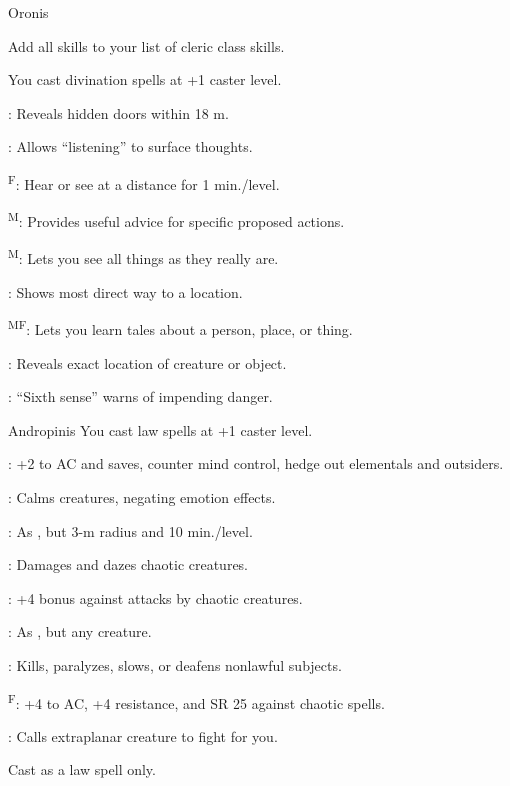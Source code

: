{Oronis}
{Add all  skills to your list of cleric class skills.

You cast divination spells at +1 caster level.}
{
	\item {}: Reveals hidden doors within 18 m.
	\item {}: Allows ``listening'' to surface thoughts.
	\item {}\textsuperscript{F}: Hear or see at a distance for 1 min./level.
	\item {}\textsuperscript{M}: Provides useful advice for specific proposed actions.
	\item {}\textsuperscript{M}: Lets you see all things as they really are.
	\item {}: Shows most direct way to a location.
	\item {}\textsuperscript{MF}: Lets you learn tales about a person, place, or thing.
	\item {}: Reveals exact location of creature or object.
	\item {}: ``Sixth sense'' warns of impending danger.
}

{Andropinis}
{You cast law spells at +1 caster level.}
{
	\item {}: +2 to AC and saves, counter mind control, hedge out elementals and outsiders.
	\item {}: Calms creatures, negating emotion effects.
	\item {}: As , but 3-m radius and 10 min./level.
	\item {}: Damages and dazes chaotic creatures.
	\item {}: +4 bonus against attacks by chaotic creatures.
	\item {}: As , but any creature.
	\item {}: Kills, paralyzes, slows, or deafens nonlawful subjects.
	\item {}\textsuperscript{F}: +4 to AC, +4 resistance, and SR 25 against chaotic spells.
	\item {}\footnotemark[1]: Calls extraplanar creature to fight for you.
}
 Cast as a law spell only.


